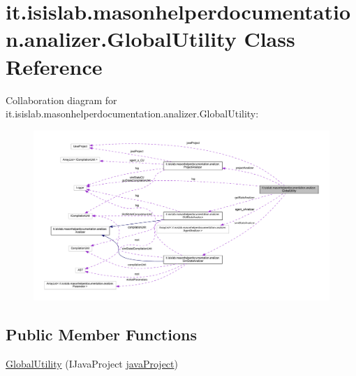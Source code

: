 \hypertarget{classit_1_1isislab_1_1masonhelperdocumentation_1_1analizer_1_1_global_utility}{\section{it.\-isislab.\-masonhelperdocumentation.\-analizer.\-Global\-Utility Class Reference}
\label{classit_1_1isislab_1_1masonhelperdocumentation_1_1analizer_1_1_global_utility}
}


Collaboration diagram for it.\-isislab.\-masonhelperdocumentation.\-analizer.\-Global\-Utility\-:
\nopagebreak
\begin{figure}[H]
\begin{center}
\leavevmode
\includegraphics[width=350pt]{classit_1_1isislab_1_1masonhelperdocumentation_1_1analizer_1_1_global_utility__coll__graph}
\end{center}
\end{figure}
\subsection*{Public Member Functions}
\begin{DoxyCompactItemize}
\item 
\hyperlink{classit_1_1isislab_1_1masonhelperdocumentation_1_1analizer_1_1_global_utility_adae135ad8b0683c4320d063c1b4f78eb}{Global\-Utility} (I\-Java\-Project \hyperlink{classit_1_1isislab_1_1masonhelperdocumentation_1_1analizer_1_1_global_utility_a7c812f3b329b2e16cfff9da4b2b1efb3}{java\-Project})
\end{DoxyCompactItemize}

